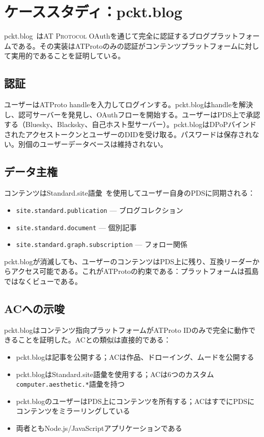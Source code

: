 \documentclass[10pt,letterpaper,twocolumn]{article}
\newcommand{\atproto}{\textsc{AT Protocol}}
\begin{document}

\section{ケーススタディ：pckt.blog}
\label{sec:pckt}

pckt.blog~\citep{pcktblog2025}は\atproto{} OAuthを通じて完全に認証するブログプラットフォームである。その実装はATProtoのみの認証がコンテンツプラットフォームに対して実用的であることを証明している。

\subsection{認証}

ユーザーはATProto handleを入力してログインする。pckt.blogはhandleを解決し、認可サーバーを発見し、OAuthフローを開始する。ユーザーはPDS上で承認する（Bluesky、Blacksky、自己ホスト型サーバー）。pckt.blogはDPoPバインドされたアクセストークンとユーザーのDIDを受け取る。パスワードは保存されない。別個のユーザーデータベースは維持されない。

\subsection{データ主権}

コンテンツはStandard.site語彙~\citep{standardsite2025}を使用してユーザー自身のPDSに同期される：

\begin{itemize}
  \item \texttt{site.standard.publication} --- ブログコレクション
  \item \texttt{site.standard.document} --- 個別記事
  \item \texttt{site.standard.graph.subscription} --- フォロー関係
\end{itemize}

pckt.blogが消滅しても、ユーザーのコンテンツはPDS上に残り、互換リーダーからアクセス可能である。これがATProtoの約束である：プラットフォームは孤島ではなくビューである。

\subsection{ACへの示唆}

pckt.blogはコンテンツ指向プラットフォームがATProto IDのみで完全に動作できることを証明した。ACとの類似は直接的である：

\begin{itemize}
  \item pckt.blogは記事を公開する；ACは作品、ドローイング、ムードを公開する
  \item pckt.blogはStandard.site語彙を使用する；ACは6つのカスタム\texttt{computer.aesthetic.*}語彙を持つ
  \item pckt.blogのユーザーはPDS上にコンテンツを所有する；ACはすでにPDSにコンテンツをミラーリングしている
  \item 両者ともNode.js/JavaScriptアプリケーションである
\end{itemize}
\end{document}
